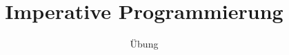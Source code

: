 \newcommand{\picturefrompdf}[7]{
	\begin{center}
		\texttt{[image: \#1]} 
	\end{center}
}

\newcommand{\rto}{$\Rightarrow$ }

\newcommand{\emp}[1]{{\color{orange}{#1}}}

\newcommand{\img}[2]{
	\centering
	\texttt{[image: figures/\#1]}
}

\newcommand{\questions}{
\begin{frame}
	
	\centering
	\Large
	Fragen?

\end{frame}
}

\newenvironment{task}[1]{
	\begin{block}{\textbf{Aufgabe} \hfill #1}
}{
	\end{block}
}


\usepackage[uni,footuni,headlogo]{./unirostock/beamerthemeRostock}


\title[]{Imperative Programmierung}

\subtitle{Übung}

